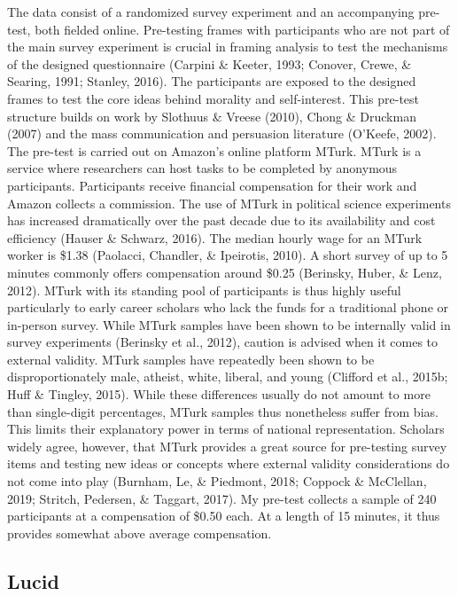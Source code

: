 \documentclass[12pt,econ]{sources/authesis}
\begin{document}
The data consist of a randomized survey experiment and an accompanying pre-test, both fielded online. Pre-testing frames with participants who are not part of the main survey experiment is crucial in framing analysis to test the mechanisms of the designed questionnaire (Carpini \& Keeter, 1993; Conover, Crewe, \& Searing, 1991; Stanley, 2016). The participants are exposed to the designed frames to test the core ideas behind morality and self-interest. This pre-test structure builds on work by Slothuus \& Vreese (2010), Chong \& Druckman (2007) and the mass communication and persuasion literature (O'Keefe, 2002). The pre-test is carried out on Amazon's online platform MTurk. MTurk is a service where researchers can host tasks to be completed by anonymous participants. Participants receive financial compensation for their work and Amazon collects a commission. The use of MTurk in political science experiments has increased dramatically over the past decade due to its availability and cost efficiency (Hauser \& Schwarz, 2016). The median hourly wage for an MTurk worker is \$1.38 (Paolacci, Chandler, \& Ipeirotis, 2010). A short survey of up to 5 minutes commonly offers compensation around \$0.25 (Berinsky, Huber, \& Lenz, 2012). MTurk with its standing pool of participants is thus highly useful particularly to early career scholars who lack the funds for a traditional phone or in-person survey. While MTurk samples have been shown to be internally valid in survey experiments (Berinsky et al., 2012), caution is advised when it comes to external validity. MTurk samples have repeatedly been shown to be disproportionately male, atheist, white, liberal, and young (Clifford et al., 2015b; Huff \& Tingley, 2015). While these differences usually do not amount to more than single-digit percentages, MTurk samples thus nonetheless suffer from bias. This limits their explanatory power in terms of national representation. Scholars widely agree, however, that MTurk provides a great source for pre-testing survey items and testing new ideas or concepts where external validity considerations do not come into play (Burnham, Le, \& Piedmont, 2018; Coppock \& McClellan, 2019; Stritch, Pedersen, \& Taggart, 2017). My pre-test collects a sample of 240 participants at a compensation of \$0.50 each. At a length of 15 minutes, it thus provides somewhat above average compensation.

\hypertarget{framing-data-lucid}{%
\subsection{Lucid}\label{framing-data-lucid}}
\end{document}
